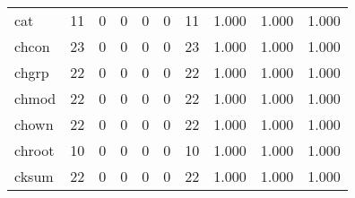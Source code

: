 \begin{longtable}{lp{2.0cm}p{2.0cm}p{2.0cm}p{2.0cm}p{2.0cm}p{2.0cm}p{2.0cm}p{2.0cm}p{2.0cm}}
cat       &                     11 &                                             0 &                                            0 &                                           0 &                                            0 &                                         11 &                                1.000 &                                  1.000 &                                1.000 \\
chcon     &                     23 &                                             0 &                                            0 &                                           0 &                                            0 &                                         23 &                                1.000 &                                  1.000 &                                1.000 \\
chgrp     &                     22 &                                             0 &                                            0 &                                           0 &                                            0 &                                         22 &                                1.000 &                                  1.000 &                                1.000 \\
chmod     &                     22 &                                             0 &                                            0 &                                           0 &                                            0 &                                         22 &                                1.000 &                                  1.000 &                                1.000 \\
chown     &                     22 &                                             0 &                                            0 &                                           0 &                                            0 &                                         22 &                                1.000 &                                  1.000 &                                1.000 \\
chroot    &                     10 &                                             0 &                                            0 &                                           0 &                                            0 &                                         10 &                                1.000 &                                  1.000 &                                1.000 \\
cksum     &                     22 &                                             0 &                                            0 &                                           0 &                                            0 &                                         22 &                                1.000 &                                  1.000 &                                1.000 \\

\end{longtable}
